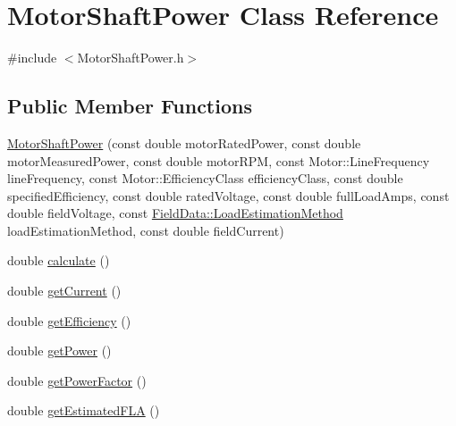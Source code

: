 \hypertarget{class_motor_shaft_power}{}\section{Motor\+Shaft\+Power Class Reference}
\label{class_motor_shaft_power}


{\ttfamily \#include $<$Motor\+Shaft\+Power.\+h$>$}

\subsection*{Public Member Functions}
\begin{DoxyCompactItemize}
\item 
\hyperlink{class_motor_shaft_power_ac60f8ec772a98056e99c82447a009ae3}{Motor\+Shaft\+Power} (const double motor\+Rated\+Power, const double motor\+Measured\+Power, const double motor\+R\+PM, const Motor\+::\+Line\+Frequency line\+Frequency, const Motor\+::\+Efficiency\+Class efficiency\+Class, const double specified\+Efficiency, const double rated\+Voltage, const double full\+Load\+Amps, const double field\+Voltage, const \hyperlink{class_field_data_a424e89914ba5684c01bb269dbe3312fd}{Field\+Data\+::\+Load\+Estimation\+Method} load\+Estimation\+Method, const double field\+Current)
\item 
double \hyperlink{class_motor_shaft_power_a65fc4f52753011c5a49376bc79bf81bc}{calculate} ()
\item 
double \hyperlink{class_motor_shaft_power_a433c78f782a5c621cc529906a0b10545}{get\+Current} ()
\item 
double \hyperlink{class_motor_shaft_power_acc28811af383f9baabb3972a9a214ac9}{get\+Efficiency} ()
\item 
double \hyperlink{class_motor_shaft_power_a4f06363ffa5a4749785b0c00ab159ea2}{get\+Power} ()
\item 
double \hyperlink{class_motor_shaft_power_aeb4d4a4a4f1317955908e214d61dbea7}{get\+Power\+Factor} ()
\item 
double \hyperlink{class_motor_shaft_power_afa22f8c81b13bc847cf78eee5734b4ef}{get\+Estimated\+F\+LA} ()
\end{DoxyCompactItemize}
